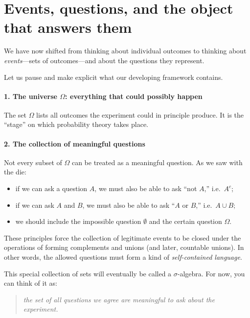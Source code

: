 \documentclass[11pt]{article}
\theoremstyle{remark}
\begin{document}
\section{Events, questions, and the object that answers them}

We have now shifted from thinking about individual outcomes to thinking about
\emph{events}—sets of outcomes—and about the questions they represent.

Let us pause and make explicit what our developing framework contains.

\paragraph{1. The universe \(\Omega\): everything that could possibly happen}

The set \(\Omega\) lists all outcomes the experiment could in principle produce.
It is the ``stage'' on which probability theory takes place.

\medskip

\paragraph{2. The collection of meaningful questions}

Not every subset of \(\Omega\) can be treated as a meaningful question.
As we saw with the die:
\begin{itemize}
\item if we can ask a question \(A\), we must also be able to ask ``not \(A\),'' i.e.\ \(A^c\);
\item if we can ask \(A\) and \(B\), we must also be able to ask ``\(A\) or \(B\),'' i.e.\ \(A\cup B\);
\item we should include the impossible question \(\emptyset\) and the certain question \(\Omega\).
\end{itemize}

These principles force the collection of legitimate events to be closed under the operations
of forming complements and unions (and later, countable unions).
In other words, the allowed questions must form a kind of \emph{self-contained language}.

This special collection of sets will eventually be called a \(\sigma\)-algebra.
For now, you can think of it as:
\begin{quote}
\emph{the set of all questions we agree are meaningful to ask about the experiment.}
\end{quote}
\end{document}

